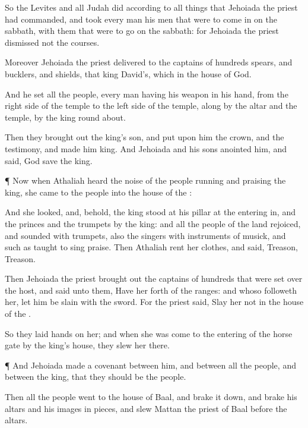 {So the
Levites and all
Judah
did according to all things that
Jehoiada the
priest had
commanded, and
took every
man his
men that were to come
in on the
sabbath, with them that were to
go
{} on the
sabbath: for
Jehoiada the
priest
dismissed not the
courses.

Moreover
Jehoiada the
priest
delivered to the
captains of
hundreds
spears, and
bucklers, and
shields, that
{}
king
David’s, which
{} in the
house of
God.

And he
set all the
people, every
man having his
weapon in his
hand, from the
right
side of the
temple to the
left
side of the
temple, along by the
altar and the
temple, by the
king round
about.

Then they brought
out the
king’s
son, and
put upon him the
crown, and
{} the
testimony, and made him
king. And
Jehoiada and his
sons
anointed him, and
said, God
save the
king.


\par }{\PP {}¶ Now when
Athaliah
heard the
noise of the
people
running and
praising the
king, she
came to the
people into the
house of the
{}:

And she
looked, and, behold, the
king
stood at his
pillar at the entering
in, and the
princes and the
trumpets by the
king: and all the
people of the
land
rejoiced, and
sounded with
trumpets, also the
singers with
instruments of
musick, and such as
taught to sing
praise. Then
Athaliah
rent her
clothes, and
said,
Treason,
Treason.

Then
Jehoiada the
priest brought
out the
captains of
hundreds that were set
over the
host, and
said unto them, Have her
forth of the
ranges: and whoso
followeth her, let him be
slain with the
sword. For the
priest
said,
Slay her not in the
house of the
{}.

So they
laid
hands on her; and when she was
come to the
entering of the
horse
gate by the
king’s
house, they
slew her there.


\par }{\PP {}¶ And
Jehoiada
made a
covenant between him, and between all the
people, and between the
king, that they should be the
{}
people.

Then all the
people
went to the
house of
Baal, and brake it
down, and
brake his
altars and his
images in
pieces, and
slew
Mattan the
priest of
Baal
before the
altars.

}
